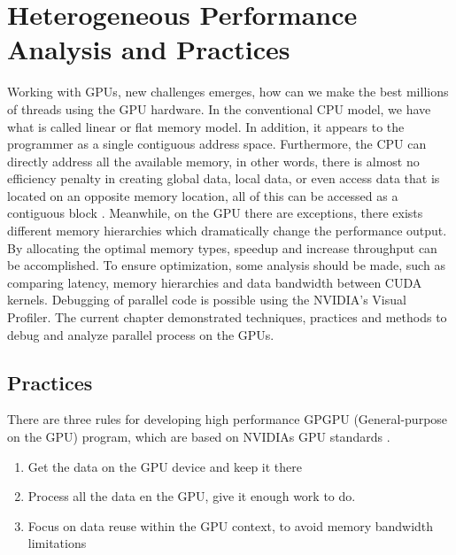 \chapter{Heterogeneous Performance Analysis and Practices} %

\label{Heterogeneous Performance Analysis and Practices} %


Working with GPUs, new challenges emerges, how can we make the best millions of threads using the GPU hardware. In the conventional CPU model, we have what is called linear or flat memory model. In addition, it appears to the programmer as a single contiguous address space. Furthermore, the CPU can directly address all the available memory, in other words, there is almost no efficiency penalty in creating global data, local data, or even access data that is located on an opposite memory location, all of this can be accessed as a contiguous block \cite{cook}. Meanwhile, on the GPU there are exceptions, there exists different memory hierarchies which dramatically change the performance output. By allocating the optimal memory types, speedup and increase throughput can be accomplished. To ensure optimization, some analysis should be made, such as comparing latency, memory hierarchies and data bandwidth between CUDA kernels. Debugging of parallel code is possible  using the NVIDIA's Visual Profiler. The current chapter demonstrated techniques, practices and methods to debug and analyze parallel process on the GPUs.

\section{Practices}

There are three rules for developing high performance GPGPU (General-purpose on the GPU) program, which are based on NVIDIAs GPU standards \cite{design}.

\begin{enumerate}
  \item Get the data on the GPU device and keep it there
  \item Process all the data en the GPU, give it enough work to do.
  \item Focus on data reuse within the GPU context, to avoid memory bandwidth limitations
\end{enumerate}

